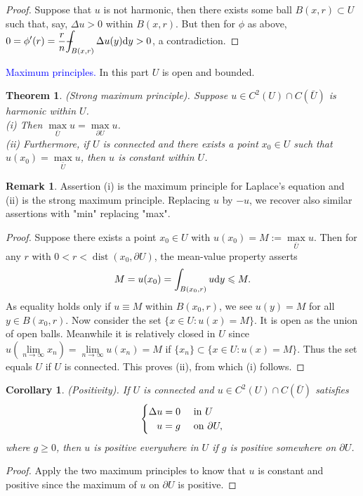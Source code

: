 \documentclass[hyperref,UTF8,12pt]{article}
\numberwithin{equation}{subsection}
\theoremstyle{plain}
\newtheorem{theorem}{Theorem}
\newtheorem{corollary}{Corollary}
\theoremstyle{definition}
\newtheorem{remark}{Remark}
\numberwithin{theorem}{section}
\numberwithin{lemma}{section}
\numberwithin{proposition}{section}
\numberwithin{remark}{section}
\numberwithin{corollary}{section}
\numberwithin{definition}{section}
\numberwithin{problem}{section}
\numberwithin{example}{section}
\def\dif{\textup{d}}
\def\Xint#1{\mathchoice
	{\XXint\displaystyle\textstyle{#1}}%
	{\XXint\textstyle\scriptstyle{#1}}%
	{\XXint\scriptstyle\scriptscriptstyle{#1}}%
	{\XXint\scriptscriptstyle\scriptscriptstyle{#1}}%
	\!\int}
\def\XXint#1#2#3{{\setbox0=\hbox{$#1{#2#3}{\int}$ }
		\vcenter{\hbox{$#2#3$ }}\kern-.55\wd0}}
\def\dashint{\Xint-}
\newcommand{\toi}[1]{{#1}\to\infty}
\newcommand{\dis}{\displaystyle}
\newcommand{\limls}{\lim\limits}
\newcommand{\ptl}{\partial}
\renewcommand{\leq}{\leqslant}
\renewcommand{\geq}{\geqslant}
\begin{document}
\begin{proof}
Suppose that $u$ is not harmonic, then there exists some ball $B(x,r)\subset U$ such that, say, $\Delta u>0$ within $B(x,r)$. But then for $\phi$ as above, $\dis0=\phi^\prime(r) =\frac{r}{n}\dashint_{B(x,r)}\Delta u(y)\dif y>0$, a contradiction.
\end{proof}
\noindent\textcolor{blue}{Maximum principles.} In this part $U$ is open and bounded.
\begin{theorem}\label{2.4}
(Strong maximum principle). Suppose $u\in C^2(U)\cap C(\bar{U})$ is harmonic within $U$.\\
\textup{(i)} Then $\max\limits_{\bar{U}} u=\max\limits_{\ptl U}u$.\\[4pt]
\textup{(ii)} Furthermore, if $U$ is connected and there exists a point $x_0\in U$ such that
$u(x_0)=\max\limits_{\bar{U}}u$, then $u$ is constant within $U$.
\end{theorem}
\begin{remark}
Assertion (i) is the maximum principle for Laplace's equation and (ii) is the strong maximum principle. Replacing $u$ by $-u$, we recover also similar assertions with "min" replacing "max".
\end{remark}
\begin{proof}
Suppose there exists a point $x_0\in U$ with $u(x_0)=M:=\max\limits_{\bar{U}}u$. Then for any $r$ with $0<r<\operatorname{dist}(x_0,\ptl U)$, the mean-value property asserts \[M=u(x_0)=\int_{B(x_0,r)}u\dif y\leq M.\]As equality holds only if $u\equiv M$ within $B(x_0,r)$, we see $u(y)=M$ for all $y\in B(x_0,r)$. Now consider the set $\{x\in U:u(x)=M\}$. It is open as the union of open balls. Meanwhile it is relatively closed in $U$ since $u(\limls_{\toi{n}}x_n)=\limls_{\toi{n}}u(x_n)=M$ if $\{x_n\}\subset\{x\in U:u(x)=M\}$. Thus the set equals $U$ if $U$ is connected. This proves (ii), from which (i) follows.
\end{proof}
\begin{corollary}
(Positivity). If $U$ is connected and $u\in C^2(U)\cap C(\bar{U})$ satisfies\[\begin{cases}
	\hfill\Delta u=0&\text{~in }U\\
	\hfill u=g&\text{~on }\ptl U,
\end{cases}\]where $g\geq 0$, then $u$ is positive everywhere in $U$ if $g$ is positive somewhere on $\ptl U$.
\end{corollary}
\begin{proof}
Apply the two maximum principles to know that $u$ is constant and positive since the maximum of $u$ on $\ptl U$ is positive.
\end{proof}
\end{document}

